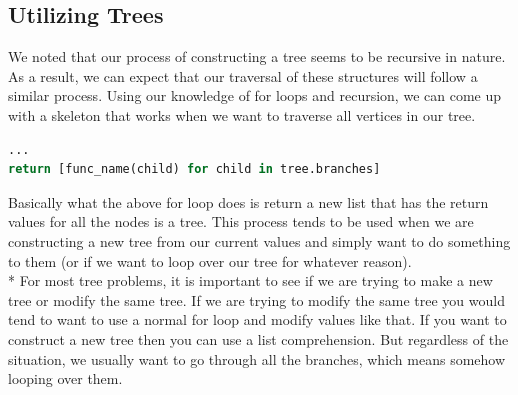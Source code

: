 \documentclass{article}
\begin{document}
\subsection{Utilizing Trees}
We noted that our process of constructing a tree seems to be recursive in nature. As a result, we can expect that our traversal of these structures will follow a similar process. Using our knowledge of for loops and recursion, we can come up with a skeleton that works when we want to traverse all vertices in our tree. 
\begin{lstlisting}[language = Python]
...
return [func_name(child) for child in tree.branches]
\end{lstlisting}
Basically what the above for loop does is return a new list that has the return values for all the nodes is a tree. This process tends to be used when we are constructing a new tree from our current values and simply want to do something to them (or if we want to loop over our tree for whatever reason).
\\*
\bigskip
For most tree problems, it is important to see if we are trying to make a new tree or modify the same tree. If we are trying to modify the same tree you would tend to want to use a normal for loop and modify values like that. If you want to construct a new tree then you can use a list comprehension. But regardless of the situation, we usually want to go through all the branches, which means somehow looping over them.
\end{document}
